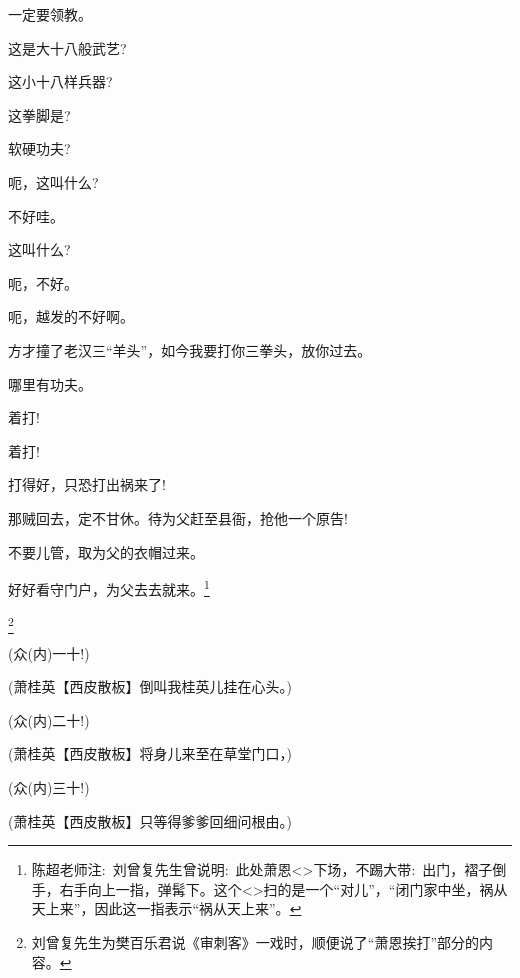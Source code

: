 {{一定要领教。}

{这是大十八般武艺?}

{这小十八样兵器?}

{这拳脚是?}

{软硬功夫?}

{呃，这叫什么?}

{不好哇。}

{这叫什么?}

{呃，不好。}

{呃，越发的不好啊。}

{方才撞了老汉三``羊头''，如今我要打你三拳头，放你过去。}

{哪里有功夫。}

{着打!}

{着打!}

{打得好，只恐打出祸来了!}

{那贼回去，定不甘休。待为父赶至县衙，抢他一个原告!}

{不要儿管，取为父的衣帽过来。}

{好好看守门户，为父去去就来。}\footnote{陈超老师注:~刘曾复先生曾说明:~此处萧恩\textless{}\!\textgreater{}{\hwfs 下场}，{\hwfs 不踢大带}:~{\hwfs 出门}，{\hwfs 褶子倒手}，{\hwfs 右手向上一指}，{\hwfs 弹髯下}。这个\textless{}\!\textgreater{}扫的是一个``对儿''，``闭门家中坐，祸从天上来''，因此这一指表示``祸从天上来''。}

\vspace{5pt}

{\footnote{刘曾复先生为樊百乐{\scriptsize 君}说《审刺客》一戏时，顺便说了``萧恩挨打''部分的内容。} }

{(众\hspace{40pt}({\akai 内})一十!)}

{(萧桂英\hspace{20pt}【{\akai 西皮散板}】倒叫我桂英儿挂在心头。)}

{(众\hspace{40pt}({\akai 内})二十!)}

{(萧桂英\hspace{20pt}【{\akai 西皮散板}】将身儿来至在草堂门口，)}

{(众\hspace{40pt}({\akai 内})三十!)}

{(萧桂英\hspace{20pt}【{\akai 西皮散板}】只等得爹爹回细问根由。)}

}
